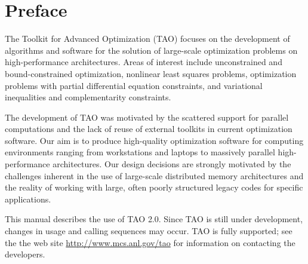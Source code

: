 
\section*{Preface}

The Toolkit for Advanced Optimization (TAO) focuses on the development
of algorithms and software for the solution of large-scale optimization 
problems on high-performance architectures.  Areas of interest include 
unconstrained and bound-constrained optimization, nonlinear least squares 
problems, optimization problems with partial differential equation 
constraints, and variational inequalities and complementarity 
constraints.

The development of TAO was motivated by the scattered support for
parallel computations and the lack of reuse of external toolkits in
current optimization software.  Our aim is to produce high-quality 
optimization software for computing environments ranging from 
workstations and laptops to massively parallel high-performance 
architectures.  Our design decisions are strongly motivated by 
the challenges inherent in the use of large-scale distributed 
memory architectures and the reality of working with large, 
often poorly structured legacy codes for specific 
applications.

This manual describes the use of TAO 2.0.  Since TAO is still under 
development, changes in usage and calling sequences may occur.  TAO 
is fully supported; see the the web site \url{http://www.mcs.anl.gov/tao} 
for information on contacting the developers.


